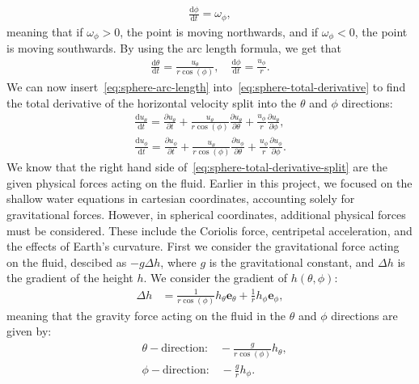 \begin{align*}
    \frac{\text{d}\phi}{\text{d}t} = \omega_\phi,
\end{align*}
meaning that if $\omega_\phi > 0$, the point is moving northwards, and if $\omega_\phi < 0$, the point is moving southwards.
By using the arc length formula, we get that 
\begin{align}\label{eq:sphere-arc-length}
    \frac{\text{d}\theta}{\text{d}t} =  \frac{u_\theta}{r \cos(\phi)},
    \quad \frac{\text{d}\phi}{\text{d}t} = \frac{u_\phi}{r}.
\end{align}
We can now insert~\eqref{eq:sphere-arc-length} into~\eqref{eq:sphere-total-derivative} to find the total derivative of the horizontal velocity split into the $\theta$ and $\phi$ directions:
\begin{equation}\label{eq:sphere-total-derivative-split}
    \begin{aligned}
        \frac{\text{d}u_\theta}{\text{d}t} = \frac{\partial u_\theta}{\partial t} + \frac{u_\theta}{r \cos(\phi)} \frac{\partial u_\theta}{\partial \theta} + \frac{u_\phi}{r} \frac{\partial u_\theta}{\partial \phi}, \\
        \frac{\text{d}u_\phi}{\text{d}t} = \frac{\partial u_\phi}{\partial t} + \frac{u_\theta}{r \cos(\phi)} \frac{\partial u_\phi}{\partial \theta} + \frac{u_\phi}{r} \frac{\partial u_\phi}{\partial \phi}.
    \end{aligned}
\end{equation}
We know that the right hand side of~\eqref{eq:sphere-total-derivative-split} are the given physical forces acting on the fluid.
Earlier in this project, we focused on the shallow water equations in cartesian coordinates, accounting solely for gravitational forces.
However, in spherical coordinates, additional physical forces must be considered. These include the Coriolis force, centripetal acceleration, and the effects of Earth's curvature.
First we consider the gravitational force acting on the fluid, descibed as $-g \Delta h$, where $g$ is the gravitational constant, and $\Delta h$ is the gradient of the height $h$.
We consider the gradient of $h(\theta, \phi)$:
\begin{align}
    \Delta h  &= \frac{1}{r \cos(\phi)} h_{\theta} \mathbf{e}_{\theta} + \frac{1}{r } h_{\phi} \mathbf{e}_{\phi},
\end{align}
meaning that the gravity force acting on the fluid in the $\theta$ and $\phi$ directions are given by:
\begin{align*}
    &\theta-\text{direction:} \quad -\frac{g}{r \cos(\phi)} h_{\theta},\\
    &\phi-\text{direction:} \quad -\frac{g}{r} h_{\phi}.
\end{align*}
